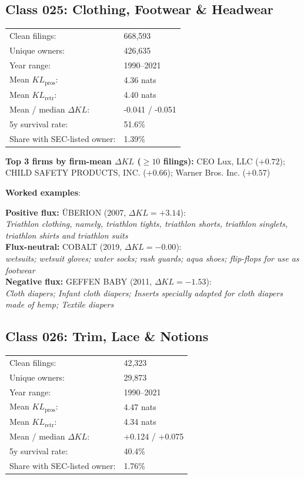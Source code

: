 \subsection*{Class 025: Clothing, Footwear \& Headwear}
\label{app:industry-025}

\begin{tabular}{ll}
Clean filings: & 668,593 \\
Unique owners: & 426,635 \\
Year range: & 1990--2021 \\
Mean $KL_\text{pros}$: & 4.36 nats \\
Mean $KL_\text{retr}$: & 4.40 nats \\
Mean / median $\Delta KL$: & -0.041 / -0.051 \\
5y survival rate: & 51.6\% \\
Share with SEC-listed owner: & 1.39\% \\
\end{tabular}

\textbf{Top 3 firms by firm-mean $\Delta KL$ ($\geq 10$ filings):} CEO Lux, LLC ($+0.72$); CHILD SAFETY PRODUCTS, INC. ($+0.66$); Warner Bros. Inc. ($+0.57$)

\textbf{Worked examples}:

  \textbf{Positive flux:} \textsc{ÜBERION} (2007, $\Delta KL=+3.14$):\\
  \textit{Triathlon clothing, namely, triathlon tights, triathlon shorts, triathlon singlets, triathlon shirts and triathlon suits}\\
  \textbf{Flux-neutral:} \textsc{COBALT} (2019, $\Delta KL=-0.00$):\\
  \textit{wetsuits; wetsuit gloves; water socks; rash guards; aqua shoes; flip-flops for use as footwear}\\
  \textbf{Negative flux:} \textsc{GEFFEN BABY} (2011, $\Delta KL=-1.53$):\\
  \textit{Cloth diapers; Infant cloth diapers; Inserts specially adapted for cloth diapers made of hemp; Textile diapers}\\

\subsection*{Class 026: Trim, Lace \& Notions}
\label{app:industry-026}

\begin{tabular}{ll}
Clean filings: & 42,323 \\
Unique owners: & 29,873 \\
Year range: & 1990--2021 \\
Mean $KL_\text{pros}$: & 4.47 nats \\
Mean $KL_\text{retr}$: & 4.34 nats \\
Mean / median $\Delta KL$: & +0.124 / +0.075 \\
5y survival rate: & 40.4\% \\
Share with SEC-listed owner: & 1.76\% \\
\end{tabular}

